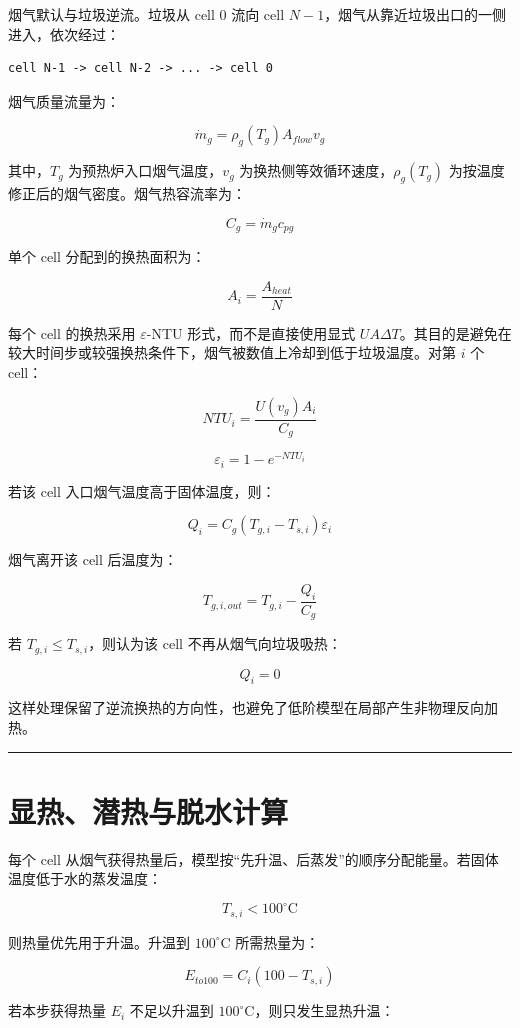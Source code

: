 \documentclass[UTF8,openany,zihao=-4,oneside]{ctexbook}
\newcommand{\manualdivider}{\par\vspace{0.6em}\noindent\textcolor{FGLine}{\rule{\linewidth}{0.7pt}}\vspace{0.6em}\par}
\begin{document}
烟气默认与垃圾逆流。垃圾从 cell 0 流向 cell \(N-1\)，烟气从靠近垃圾出口的一侧进入，依次经过：

\begin{lstlisting}
cell N-1 -> cell N-2 -> ... -> cell 0
\end{lstlisting}

烟气质量流量为：

\[
\dot m_g=\rho_g(T_g)A_{flow}v_g
\]

其中，\(T_g\) 为预热炉入口烟气温度，\(v_g\) 为换热侧等效循环速度，\(\rho_g(T_g)\) 为按温度修正后的烟气密度。烟气热容流率为：

\[
C_g=\dot m_gc_{pg}
\]

单个 cell 分配到的换热面积为：

\[
A_i=\frac{A_{heat}}{N}
\]

每个 cell 的换热采用 \(\varepsilon\)-NTU 形式，而不是直接使用显式 \(UA\Delta T\)。其目的是避免在较大时间步或较强换热条件下，烟气被数值上冷却到低于垃圾温度。对第 \(i\) 个 cell：

\[
NTU_i=\frac{U(v_g)A_i}{C_g}
\]

\[
\varepsilon_i=1-e^{-NTU_i}
\]

若该 cell 入口烟气温度高于固体温度，则：

\[
Q_i=C_g(T_{g,i}-T_{s,i})\varepsilon_i
\]

烟气离开该 cell 后温度为：

\[
T_{g,i,out}=T_{g,i}-\frac{Q_i}{C_g}
\]

若 \(T_{g,i}\le T_{s,i}\)，则认为该 cell 不再从烟气向垃圾吸热：

\[
Q_i=0
\]

这样处理保留了逆流换热的方向性，也避免了低阶模型在局部产生非物理反向加热。

\manualdivider

\section{显热、潜热与脱水计算}\label{ux663eux70edux6f5cux70edux4e0eux8131ux6c34ux8ba1ux7b97}

每个 cell 从烟气获得热量后，模型按“先升温、后蒸发”的顺序分配能量。若固体温度低于水的蒸发温度：

\[
T_{s,i}<100^\circ\mathrm{C}
\]

则热量优先用于升温。升温到 \(100^\circ\mathrm{C}\) 所需热量为：

\[
E_{to100}=C_i(100-T_{s,i})
\]

若本步获得热量 \(E_i\) 不足以升温到 \(100^\circ\mathrm{C}\)，则只发生显热升温：
\end{document}
